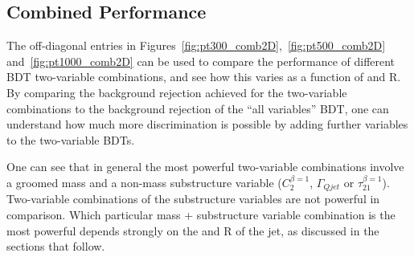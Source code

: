 %


\subsection{Combined Performance}

The off-diagonal entries in Figures~\ref{fig:pt300_comb2D},~\ref{fig:pt500_comb2D}
and~\ref{fig:pt1000_comb2D} can be used to compare the performance
of different BDT two-variable combinations, and see how this varies as
a function of \pt and R. By comparing the background rejection
achieved for the two-variable combinations to the background rejection
of the ``all variables'' BDT, one can understand how much more
discrimination is possible by adding further variables to the
two-variable BDTs.

One can see that in general the most powerful two-variable
combinations involve a groomed mass and a non-mass substructure
variable ($C_2^{\beta=1}$, $\Gamma_{Qjet}$ or
$\tau_{21}^{\beta=1}$). Two-variable combinations of the substructure
variables are not powerful in comparison.  Which particular mass +
substructure variable combination is the most
powerful depends strongly on the \pt and R of the jet, as discussed
in the sections that follow. 

